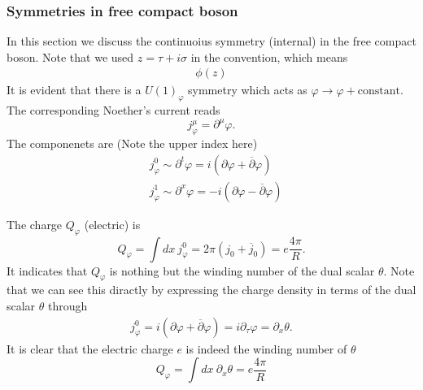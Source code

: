 \subsubsection{Symmetries in free compact boson}
In this section we discuss the continuoius symmetry (internal) in the free compact boson. Note that we used $z = \tau + i\sigma$ in the convention, which means
\begin{equation}
	\begin{aligned}
		\phi(z) 
	\end{aligned}
\end{equation}
It is evident that there is a ${U(1)}_\varphi$ symmetry which acts as $\varphi \rightarrow \varphi + \mathrm{constant}$. The corresponding Noether's current reads
\begin{equation}
	j^\mu_\varphi = \partial^\mu \varphi.
\end{equation}  
The componenets are (Note the upper index here)
\begin{equation}
	\begin{aligned}
		&j^0_\varphi \sim \partial^t\varphi = i \left(\partial \varphi + \overline{\partial} {\varphi}\right) \\
		&j^1_\varphi \sim \partial^x\varphi = -i\left( \partial \varphi - \overline{\partial}\varphi \right)
	\end{aligned}
\end{equation}

The charge $Q_\varphi$ (electric) is 
\begin{equation}
	Q_\varphi = \int dx \ j^0_\varphi = 2\pi\left(j_0 + \overline{j}_0\right) = e \frac{4\pi}{R}.
\end{equation}
It indicates that $Q_\varphi$ is nothing but the winding number of the dual scalar $\theta$. Note that we can see this diractly by expressing the charge density in terms of the dual scalar $\theta$ through
\begin{equation}
	\begin{aligned}
		j^0_\varphi = i \left(\partial \varphi + \overline{\partial} \varphi\right) = i \partial_\tau \varphi = \partial_x \theta.
	\end{aligned}
\end{equation}
It is clear that the electric charge $e$ is indeed the winding number of $\theta$ 
\begin{equation}
	Q_\varphi = \int dx \ \partial_x \theta = e \frac{4\pi}{R}
\end{equation}


